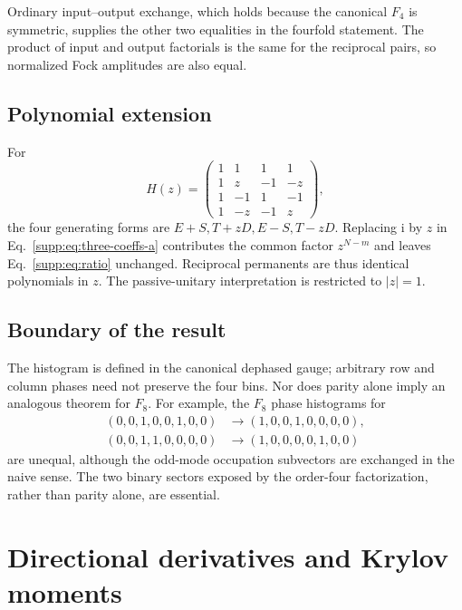 \documentclass[aps,pra,onecolumn,amsmath,amssymb,superscriptaddress,longbibliography]{revtex4-2}
\newcommand{\ii}{\mathrm{i}}
\begin{document}
Ordinary input--output exchange, which holds because the canonical $F_4$ is
symmetric, supplies the other two equalities in the fourfold statement.
The product of input and output factorials is the same for the reciprocal
pairs, so normalized Fock amplitudes are also equal.

\subsection{Polynomial extension}

For
\begin{equation}
H(z)=
\begin{pmatrix}
1&1&1&1\\
1&z&-1&-z\\
1&-1&1&-1\\
1&-z&-1&z
\end{pmatrix},
\end{equation}
the four generating forms are $E+S,T+zD,E-S,T-zD$.  Replacing $\ii$ by
$z$ in Eq.~\eqref{supp:eq:three-coeffs-a} contributes the common factor
$z^{N-m}$ and leaves Eq.~\eqref{supp:eq:ratio} unchanged.  Reciprocal
permanents are thus identical polynomials in $z$.  The passive-unitary
interpretation is restricted to $|z|=1$.

\subsection{Boundary of the result}

The histogram is defined in the canonical dephased gauge; arbitrary row and
column phases need not preserve the four bins.  Nor does parity alone imply
an analogous theorem for $F_8$.  For example, the $F_8$ phase histograms for
\begin{align}
(0,0,1,0,0,1,0,0)&\longrightarrow(1,0,0,1,0,0,0,0),\nonumber\\
(0,0,1,1,0,0,0,0)&\longrightarrow(1,0,0,0,0,1,0,0)
\end{align}
are unequal, although the odd-mode occupation subvectors are exchanged in
the naive sense.  The two binary sectors exposed by the order-four
factorization, rather than parity alone, are essential.

\section{Directional derivatives and Krylov moments}
\label{supp:moments}
\end{document}
